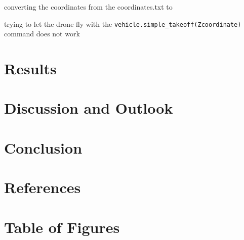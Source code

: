 \documentclass{article}
\begin{document}
	
	converting the coordinates from the coordinates.txt to 
	
	trying to let the drone fly with the \lstinline|vehicle.simple_takeoff(Zcoordinate)| command does not work
	
	
	\section{Results}
	\section{Discussion and Outlook}
	\section{Conclusion}
	
	\section{References}
	\printbibliography[
	heading=bibintoc,
	title={Bibliography}
	]	
	\section{Table of Figures}
	
	\printglossary[type=\acronymtype]
	
\end{document}

